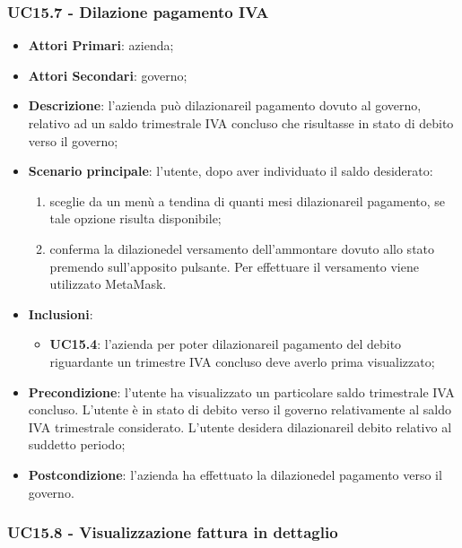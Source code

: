\subsubsection{UC15.7 - Dilazione pagamento IVA}
\begin{itemize}
	\item \textbf{Attori Primari}: azienda;
	\item \textbf{Attori Secondari}: governo;
	\item \textbf{Descrizione}: l'azienda può dilazionare\glosp il pagamento dovuto al governo, relativo ad un saldo trimestrale IVA concluso che risultasse in stato di debito verso il governo;
	\item \textbf{Scenario principale}: l'utente, dopo aver individuato il saldo desiderato:
	\begin{enumerate}[label=\alph*.]
		\item sceglie da un menù a tendina di quanti mesi dilazionare\glosp il pagamento, se tale opzione risulta disponibile;
		\item conferma la dilazione\glosp del versamento dell'ammontare dovuto allo stato premendo sull'apposito pulsante. Per effettuare il versamento viene utilizzato MetaMask\glo.
	\end{enumerate}
	 
	\item \textbf{Inclusioni}:
	\begin{itemize}
		\item \textbf{UC15.4}: l'azienda per poter dilazionare\glosp il pagamento del debito riguardante un trimestre IVA concluso deve averlo prima visualizzato;
	\end{itemize}
	\item \textbf{Precondizione}: l'utente ha visualizzato un particolare saldo trimestrale IVA concluso. L'utente è in stato di debito verso il governo relativamente al saldo IVA trimestrale considerato. L'utente desidera dilazionare\glosp il debito relativo al suddetto periodo; 
	\item \textbf{Postcondizione}: l'azienda ha effettuato la dilazione\glosp del pagamento verso il governo.
\end{itemize} 

\subsubsection{UC15.8 - Visualizzazione fattura in dettaglio}

